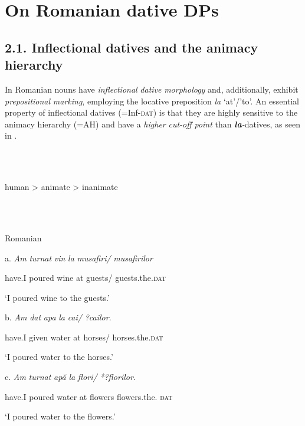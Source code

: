 \documentclass[output=paper,modfonts,nonflat]{langsci/langscibook}
\begin{document}
\section{On Romanian dative DPs} %

\subsection{\textbf{2.1.} \textbf{Inflectional} \textbf{datives} \textbf{and} \textbf{the} \textbf{animacy} \textbf{hierarchy}}

In Romanian nouns have \textit{inflectional} \textit{dative} \textit{morphology} and, additionally, exhibit \textit{prepositional} \textit{marking}, employing the locative preposition \textit{la} ‘at’/’to’. An essential property of inflectional datives (=Inf-\textsc{dat}) is that they are highly sensitive to the animacy hierarchy (=AH) and have a \textit{higher} \textit{cut-off} \textit{point} than \textbf{\textit{la}}\textit{{}-}datives, as seen in . 

\ea%
    \label{ex:key:7}
    \gll\\
        \\
    \glt
    \z

          human  >  animate    > inanimate

\ea%
    \label{ex:key:8}
    \gll\\
        \\
    \glt
    \z

          Romanian

  a.  \textit{Am}   \textit{turnat}  \textit{vin}   \textit{la} \textit{musafiri/}   \textit{musafirilor}

    have.I   poured   wine   at guests/   guests.the.\textsc{dat}

    ‘I poured wine to the guests.’

  b.  \textit{Am} \textit{dat}    \textit{apa}  \textit{la} \textit{cai/}     \textit{?cailor}.

    have.I given   water   at horses/  horses.the.\textsc{dat} 

    ‘I poured water to the horses.’

  c.  \textit{Am} \textit{turnat}  \textit{apă}  \textit{la} \textit{flori/}   \textit{*?florilor.}

    have.I poured   water   at flowers   flowers.the. \textsc{dat} 

    ‘I poured water to the flowers.’
\end{document}
